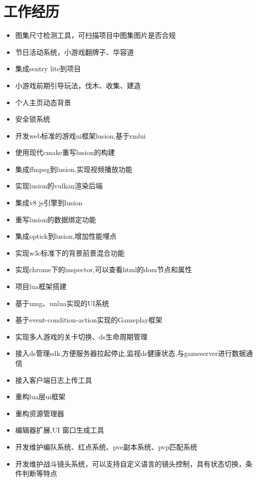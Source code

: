 \documentclass{resume}
\begin{document}
\section{工作经历}
\begin{itemize}
  \item 图集尺寸检测工具，可扫描项目中图集图片是否合规
  \item 节日活动系统，小游戏翻牌子、华容道
  \item 集成sentry lite到项目
  \item 小游戏前期引导玩法，伐木、收集、建造
  \item 个人主页动态背景
  \item 安全锁系统
\end{itemize}
\begin{itemize}
  \item 开发web标准的游戏ui框架lusion,基于rmlui
  \item 使用现代cmake重写lusion的构建
  \item 集成ffmpeg到lusion,实现视频播放功能
  \item 实现lusion的vulkan渲染后端
  \item 集成v8 js引擎到lusion
  \item 重写lusion的数据绑定功能
  \item 集成optick到lusion,增加性能埋点
  \item 实现w3c标准下的背景前景混合功能
  \item 实现chrome下的inspector,可以查看html的dom节点和属性
\end{itemize}
\begin{itemize}
  \item 项目lua框架搭建
  \item 基于umg、unlua实现的UI系统
  \item 基于event-condition-action实现的Gameplay框架
  \item 实现多人游戏的关卡切换、ds生命周期管理
  \item 接入ds管理sdk,方便服务器拉起停止,监视ds健康状态,与gameserver进行数据通信
  \item 接入客户端日志上传工具
\end{itemize}
\begin{itemize}
  \item 重构lua层ui框架
  \item 重构资源管理器
  \item 编辑器扩展,UI 窗口生成工具
  \item 开发维护编队系统、红点系统、pve副本系统、pvp匹配系统
  \item 开发维护战斗镜头系统，可以支持自定义语言的镜头控制，具有状态切换，条件判断等特点
\end{itemize}



%
%
\end{document}
